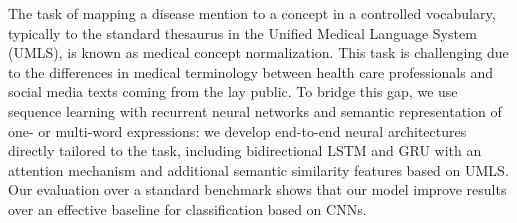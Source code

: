 The task of mapping a disease mention to a concept in a controlled vocabulary, typically to the standard thesaurus in the Unified Medical Language System (UMLS), is known as medical concept normalization. This task is challenging due to the differences in medical terminology between health care professionals and social media texts coming from the lay public. To bridge this gap, we use sequence learning with recurrent neural networks and semantic representation of one- or multi-word expressions: we develop end-to-end neural architectures directly tailored to the task, including bidirectional LSTM and GRU with an attention mechanism and additional semantic similarity features based on UMLS. Our evaluation over a standard benchmark shows that our model improve results over an effective baseline for classification based on CNNs.
